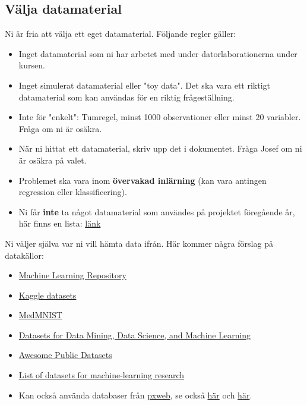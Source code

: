 \documentclass[a4paper]{article}
\begin{document}
\subsection*{Välja datamaterial}
Ni är fria att välja ett eget datamaterial. Följande regler gäller:
\begin{itemize}
    \item Inget datamaterial som ni har arbetet med under datorlaborationerna under kursen.
    \item Inget simulerat datamaterial eller "toy data". Det ska vara ett riktigt datamaterial som kan användas för en riktig frågeställning.
    \item Inte för "enkelt": Tumregel, minst 1000 observationer eller minst 20 variabler. Fråga om ni är osäkra.
    \item När ni hittat ett datamaterial, skriv upp det i dokumentet. Fråga Josef om ni är osäkra på valet.
    \item Problemet ska vara inom \textbf{övervakad inlärning} (kan vara antingen regression eller klassificering).
    \item Ni får \textbf{inte} ta något datamaterial som användes på projektet föregående år, här finns en lista: \href{https://liuonline.sharepoint.com/:x:/r/sites/Lisam_732G57_2025HT_O2/CourseDocuments/datamaterial_projeket_2024.xlsx?d=wd84cf1abe387489aa32aa4cb91f34cca&csf=1&web=1&e=Xmv8rr}{länk}
\end{itemize}
Ni väljer själva var ni vill hämta data ifrån. Här kommer några förslag på datakällor:
\begin{itemize}
    \item \href{https://archive.ics.uci.edu/ml/index.php}{Machine Learning Repository}
    \item \href{https://www.kaggle.com/datasets}{Kaggle datasets}
    \item \href{https://medmnist.com/}{MedMNIST}
    \item \href{https://www.kdnuggets.com/datasets/index.html}{Datasets for Data Mining, Data Science, and Machine Learning}
    \item \href{https://github.com/awesomedata/awesome-public-datasets}{Awesome Public Datasets}
    \item \href{https://en.wikipedia.org/wiki/List_of_datasets_for_machine-learning_research}{List of datasets for machine-learning research}
    \item Kan också använda databaser från \href{https://cran.r-project.org/web/packages/pxweb/index.html}{pxweb}, se också \href{https://cran.r-project.org/web/packages/pxweb/vignettes/pxweb.html}{här} och \href{https://www.scb.se/en/services/statistical-programs-for-px-files/px-web/pxweb-examples/}{här}.
\end{itemize}
\end{document}

